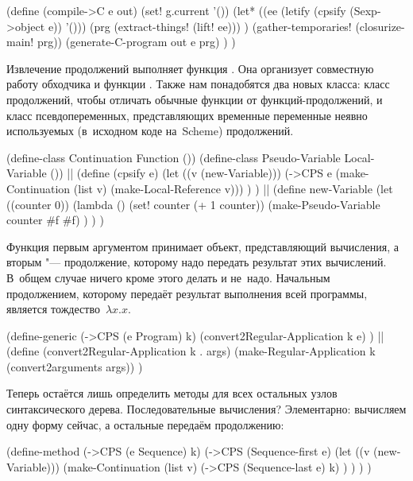 \begin{code:lisp}
(define (compile->C e out)
  (set! g.current '())
  (let* ((ee (letify (cpsify (Sexp->object e)) '()))
         (prg (extract-things! (lift! ee))) )
    (gather-temporaries! (closurize-main! prg))
    (generate-C-program out e prg) ) )
\end{code:lisp}

Извлечение продолжений выполняет функция . Она организует совместную
работу обходчика  и функции . Также нам понадобятся
два новых класса: класс продолжений, чтобы отличать обычные функции от
функций-продолжений, и класс псевдопеременных, представляющих временные
переменные неявно используемых (в~исходном коде на~Scheme) продолжений.

\begin{code:lisp}
(define-class Continuation    Function ())
(define-class Pseudo-Variable Local-Variable ())
||
(define (cpsify e)
  (let ((v (new-Variable)))
    (->CPS e (make-Continuation (list v) (make-Local-Reference v))) ) )
||
(define new-Variable
  (let ((counter 0))
    (lambda ()
      (set! counter (+ 1 counter))
      (make-Pseudo-Variable counter #f #f) ) ) )
\end{code:lisp}

Функция  первым аргументом принимает объект, представляющий
вычисления, а вторым "--- продолжение, которому надо передать результат этих
вычислений. В~общем случае ничего кроме этого делать и не~надо. Начальным
продолжением, которому  передаёт результат выполнения всей программы,
является тождество~$\lambda x . x$.

\begin{code:lisp}
(define-generic (->CPS (e Program) k)
  (convert2Regular-Application k e) )
||
(define (convert2Regular-Application k . args)
  (make-Regular-Application k (convert2arguments args)) )
\end{code:lisp}

Теперь остаётся лишь определить методы для всех остальных узлов синтаксического
дерева. Последовательные вычисления? Элементарно: вычисляем одну форму сейчас,
а остальные передаём продолжению:

\begin{code:lisp}
(define-method (->CPS (e Sequence) k)
  (->CPS (Sequence-first e)
         (let ((v (new-Variable)))
           (make-Continuation
            (list v) (->CPS (Sequence-last e) k) ) ) ) )
\end{code:lisp}

